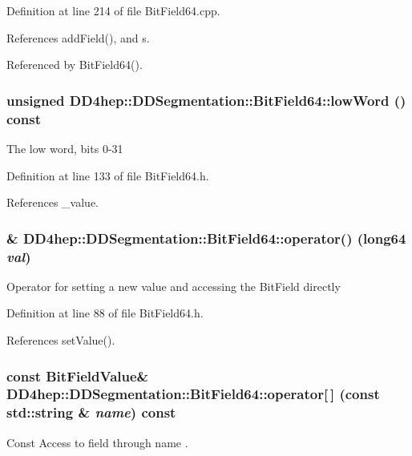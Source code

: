 Definition at line 214 of file BitField64.cpp.

References addField(), and s.

Referenced by BitField64().\hypertarget{class_d_d4hep_1_1_d_d_segmentation_1_1_bit_field64_abb2987e2f7638dc69cb9ae8b2c4b5fa9}{
\subsubsection[{lowWord}]{\setlength{\rightskip}{0pt plus 5cm}unsigned DD4hep::DDSegmentation::BitField64::lowWord () const}}
\label{class_d_d4hep_1_1_d_d_segmentation_1_1_bit_field64_abb2987e2f7638dc69cb9ae8b2c4b5fa9}
The low word, bits 0-\/31 

Definition at line 133 of file BitField64.h.

References \_\-value.\hypertarget{class_d_d4hep_1_1_d_d_segmentation_1_1_bit_field64_af77a45d60bd3947bbfcd7822b06cbc9f}{
\subsubsection[{operator()}]{\& DD4hep::DDSegmentation::BitField64::operator() ({\bf long64} {\em val})}}
\label{class_d_d4hep_1_1_d_d_segmentation_1_1_bit_field64_af77a45d60bd3947bbfcd7822b06cbc9f}
Operator for setting a new value and accessing the BitField directly 

Definition at line 88 of file BitField64.h.

References setValue().\hypertarget{class_d_d4hep_1_1_d_d_segmentation_1_1_bit_field64_a5aadc2c387ee66ad3184dc00f7d5a36c}{
\subsubsection[{operator[]}]{\setlength{\rightskip}{0pt plus 5cm}const {\bf BitFieldValue}\& DD4hep::DDSegmentation::BitField64::operator\mbox{[}$\,$\mbox{]} (const std::string \& {\em name}) const}}
\label{class_d_d4hep_1_1_d_d_segmentation_1_1_bit_field64_a5aadc2c387ee66ad3184dc00f7d5a36c}
Const Access to field through name . 

